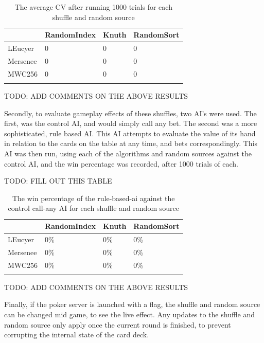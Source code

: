 \begin{table}[h]
    \centering
    \begin{tabular}{l l l l}
    \toprule
                & RandomIndex   & Knuth & RandomSort  \\
    \midrule
    LEucyer     & 0             & 0     & 0           \\ \addlinespace
    Mersenee    & 0             & 0     & 0           \\ \addlinespace
    MWC256      & 0             & 0     & 0           \\ \addlinespace
    \bottomrule
    \end{tabular}
    \caption{The average CV after running 1000 trials for each shuffle and
             random source}
\end{table}

TODO: ADD COMMENTS ON THE ABOVE RESULTS

Secondly, to evaluate gameplay effects of these shuffles, two AI's were used.
The first, was the control AI, and would simply call any bet. The second
was a more sophisticated, rule based AI\@. This AI attempts to evaluate the value
of its hand in relation to the cards on the table at any time, and bets
correspondingly. This AI was then run, using each of the algorithms and
random sources against the control AI, and the win percentage was recorded,
after 1000 trials of each.

TODO: FILL OUT THIS TABLE

\begin{table}[h]
    \centering
    \begin{tabular}{l l l l}
    \toprule
                & RandomIndex   & Knuth & RandomSort  \\
    \midrule
    LEucyer     & 0\%           & 0\%   & 0\%         \\ \addlinespace
    Mersenee    & 0\%           & 0\%   & 0\%         \\ \addlinespace
    MWC256      & 0\%           & 0\%   & 0\%         \\ \addlinespace
    \bottomrule
    \end{tabular}
    \caption{The win percentage of the rule-based-ai against the control
             call-any AI for each shuffle and random source}
\end{table}

TODO: ADD COMMENTS ON THE ABOVE RESULTS

Finally, if the poker server is launched with a flag, the shuffle and random
source can be changed mid game, to see the live effect. Any updates to the
shuffle and random source only apply once the current round is finished, to
prevent corrupting the internal state of the card deck.

